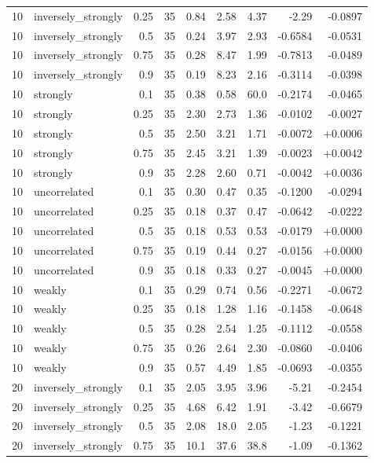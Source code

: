 \begin{tabular}{rlrrrrrrr}
10 & inversely\_strongly & 0.25 & 35 & 0.84 & 2.58 & 4.37 & -2.29 & -0.0897 \\
10 & inversely\_strongly & 0.5 & 35 & 0.24 & 3.97 & 2.93 & -0.6584 & -0.0531 \\
10 & inversely\_strongly & 0.75 & 35 & 0.28 & 8.47 & 1.99 & -0.7813 & -0.0489 \\
10 & inversely\_strongly & 0.9 & 35 & 0.19 & 8.23 & 2.16 & -0.3114 & -0.0398 \\
10 & strongly & 0.1 & 35 & 0.38 & 0.58 & 60.0 & -0.2174 & -0.0465 \\
10 & strongly & 0.25 & 35 & 2.30 & 2.73 & 1.36 & -0.0102 & -0.0027 \\
10 & strongly & 0.5 & 35 & 2.50 & 3.21 & 1.71 & -0.0072 & +0.0006 \\
10 & strongly & 0.75 & 35 & 2.45 & 3.21 & 1.39 & -0.0023 & +0.0042 \\
10 & strongly & 0.9 & 35 & 2.28 & 2.60 & 0.71 & -0.0042 & +0.0036 \\
10 & uncorrelated & 0.1 & 35 & 0.30 & 0.47 & 0.35 & -0.1200 & -0.0294 \\
10 & uncorrelated & 0.25 & 35 & 0.18 & 0.37 & 0.47 & -0.0642 & -0.0222 \\
10 & uncorrelated & 0.5 & 35 & 0.18 & 0.53 & 0.53 & -0.0179 & +0.0000 \\
10 & uncorrelated & 0.75 & 35 & 0.19 & 0.44 & 0.27 & -0.0156 & +0.0000 \\
10 & uncorrelated & 0.9 & 35 & 0.18 & 0.33 & 0.27 & -0.0045 & +0.0000 \\
10 & weakly & 0.1 & 35 & 0.29 & 0.74 & 0.56 & -0.2271 & -0.0672 \\
10 & weakly & 0.25 & 35 & 0.18 & 1.28 & 1.16 & -0.1458 & -0.0648 \\
10 & weakly & 0.5 & 35 & 0.28 & 2.54 & 1.25 & -0.1112 & -0.0558 \\
10 & weakly & 0.75 & 35 & 0.26 & 2.64 & 2.30 & -0.0860 & -0.0406 \\
10 & weakly & 0.9 & 35 & 0.57 & 4.49 & 1.85 & -0.0693 & -0.0355 \\
20 & inversely\_strongly & 0.1 & 35 & 2.05 & 3.95 & 3.96 & -5.21 & -0.2454 \\
20 & inversely\_strongly & 0.25 & 35 & 4.68 & 6.42 & 1.91 & -3.42 & -0.6679 \\
20 & inversely\_strongly & 0.5 & 35 & 2.08 & 18.0 & 2.05 & -1.23 & -0.1221 \\
20 & inversely\_strongly & 0.75 & 35 & 10.1 & 37.6 & 38.8 & -1.09 & -0.1362 \\

\end{tabular}
